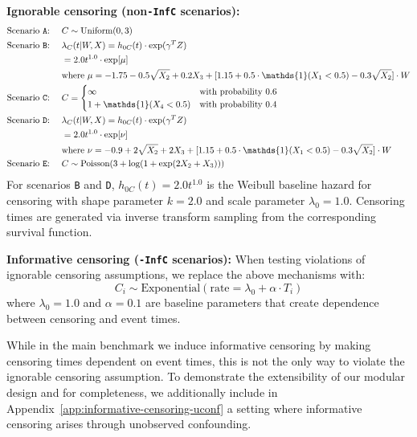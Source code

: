 \documentclass{article} %
\newcommand{\ind}{\mathds{1}}
\begin{document}
\textbf{Ignorable censoring (non\texttt{-InfC} scenarios):}
\begin{align*}
\text{Scenario \texttt{A}: } \quad &C \sim \text{Uniform}(0, 3) \\
\text{Scenario \texttt{B}: } \quad &\lambda_C(t | W, X) = h_{0C}(t) \cdot \exp(\gamma^T Z) \\
&= 2.0t^{1.0} \cdot \exp[\mu] \\
&\text{where } \mu = -1.75 - 0.5\sqrt{X_{2}} + 0.2X_{3} + [1.15 + 0.5 \cdot \ind(X_{1} < 0.5) - 0.3\sqrt{X_{2}}] \cdot W \\
\text{Scenario \texttt{C}: } \quad &C = \begin{cases} 
\infty & \text{with probability } 0.6 \\
1 + \ind(X_{4} < 0.5) & \text{with probability } 0.4
\end{cases} \\
\text{Scenario \texttt{D}: } \quad &\lambda_C(t | W, X) = h_{0C}(t) \cdot \exp(\gamma^T Z) \\
&= 2.0t^{1.0} \cdot \exp[\nu] \\
&\text{where } \nu = -0.9 + 2\sqrt{X_{2}} + 2X_{3} + [1.15 + 0.5 \cdot \ind(X_{1} < 0.5) - 0.3\sqrt{X_{2}}] \cdot W \\
\text{Scenario \texttt{E}: } \quad &C \sim \text{Poisson}(3 + \log(1 + \exp(2X_{2} + X_{3})))
\end{align*}
For scenarios \texttt{B} and \texttt{D}, $h_{0C}(t) = 2.0t^{1.0}$ is the Weibull baseline hazard for censoring with shape parameter $k=2.0$ and scale parameter $\lambda_0=1.0$. Censoring times are generated via inverse transform sampling from the corresponding survival function.

\textbf{Informative censoring (\texttt{-InfC} scenarios):} When testing violations of ignorable censoring assumptions, we replace the above mechanisms with:
\begin{equation}
C_i \sim \text{Exponential}(\text{rate} = \lambda_0 + \alpha \cdot T_i)
\end{equation}
where $\lambda_0 = 1.0$ and $\alpha = 0.1$ are baseline parameters that create dependence between censoring and event times.

While in the main benchmark we induce informative censoring by making censoring times dependent on event times, this is not the only way to violate the ignorable censoring assumption. To demonstrate the extensibility of our modular design and for completeness, we additionally include in Appendix~\ref{app:informative-censoring-uconf} a setting where informative censoring arises through unobserved confounding.
\end{document}
